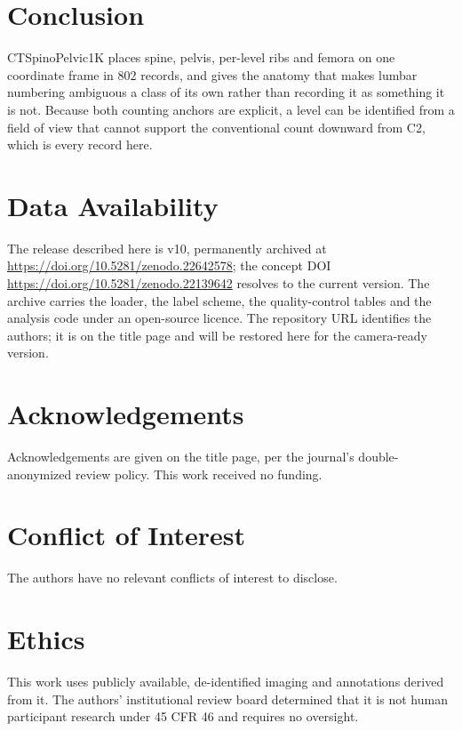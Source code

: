 \documentclass[aapm,mph,amsmath,amssymb,reprint]{revtex4-2}
\newcommand{\datasetdoi}{10.5281/zenodo.22139642}
\newcommand{\datasetversiondoi}{10.5281/zenodo.22642578}
\newcommand{\datasetversion}{v10}
\newif\ifreview \reviewtrue
\newcommand{\doiurl}[1]{\url{https://doi.org/#1}}
\begin{document}
\section{Conclusion}

CTSpinoPelvic1K places spine, pelvis, per-level ribs and femora on one coordinate frame in
802 records, and gives the anatomy that makes lumbar numbering ambiguous a class of its own
rather than recording it as something it is not. Because both counting anchors are explicit,
a level can be identified from a field of view that cannot support the conventional count
downward from C2, which is every record here.

\section*{Data Availability}
The release described here is \datasetversion{}, permanently archived at
\doiurl{\datasetversiondoi}; the concept DOI \doiurl{\datasetdoi} resolves to the
current version.
The archive carries the loader, the label scheme, the quality-control tables and the
analysis code under an open-source licence. \ifreview The repository URL identifies the authors; it
is on the title page and will be restored here for the camera-ready version.\else Code:
\url{https://github.com/OpenSpineConsortium/CTSpinoPelvic1K}; convenience mirror:
\url{https://huggingface.co/datasets/OpenSpineConsortium/CTSpinoPelvic1K}.\fi

\section*{Acknowledgements}
Acknowledgements are given on the title page, per the journal's double-anonymized review
policy. This work received no funding.

\section*{Conflict of Interest}
The authors have no relevant conflicts of interest to disclose.

\section*{Ethics}
This work uses publicly available, de-identified imaging and annotations derived from it.
The authors' institutional review board determined that it is not human participant
research under 45 CFR 46 and requires no oversight.
\end{document}
